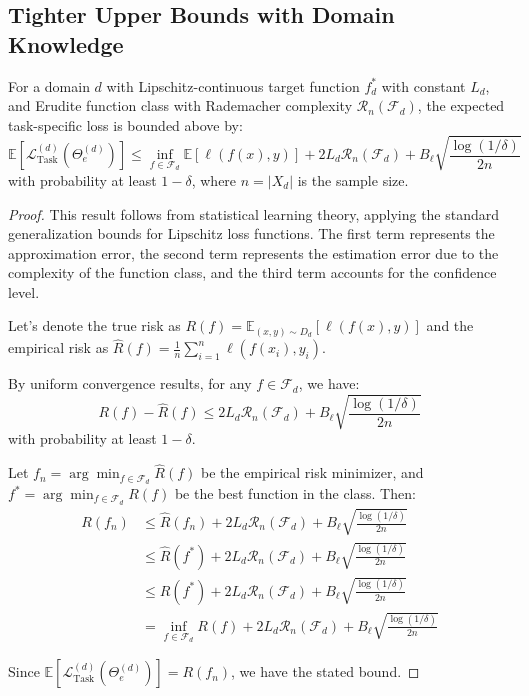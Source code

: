\subsection{Tighter Upper Bounds with Domain Knowledge}

\begin{theorem}
For a domain $d$ with Lipschitz-continuous target function $f^*_d$ with constant $L_d$, and Erudite function class with Rademacher complexity $\mathcal{R}_n(\mathcal{F}_d)$, the expected task-specific loss is bounded above by:
\begin{equation}
\mathbb{E}[\mathcal{L}_{\text{Task}}^{(d)}(\Theta_e^{(d)})] \leq \inf_{f \in \mathcal{F}_d} \mathbb{E}[\ell(f(x), y)] + 2L_d\mathcal{R}_n(\mathcal{F}_d) + B_{\ell}\sqrt{\frac{\log(1/\delta)}{2n}}
\end{equation}
with probability at least $1-\delta$, where $n = |X_d|$ is the sample size.
\end{theorem}

\begin{proof}
This result follows from statistical learning theory, applying the standard generalization bounds for Lipschitz loss functions. The first term represents the approximation error, the second term represents the estimation error due to the complexity of the function class, and the third term accounts for the confidence level.

Let's denote the true risk as $R(f) = \mathbb{E}_{(x,y) \sim D_d}[\ell(f(x), y)]$ and the empirical risk as $\hat{R}(f) = \frac{1}{n}\sum_{i=1}^{n} \ell(f(x_i), y_i)$.

By uniform convergence results, for any $f \in \mathcal{F}_d$, we have:
\begin{equation}
R(f) - \hat{R}(f) \leq 2L_d\mathcal{R}_n(\mathcal{F}_d) + B_{\ell}\sqrt{\frac{\log(1/\delta)}{2n}}
\end{equation}
with probability at least $1-\delta$.

Let $f_n = \arg\min_{f \in \mathcal{F}_d} \hat{R}(f)$ be the empirical risk minimizer, and $f^* = \arg\min_{f \in \mathcal{F}_d} R(f)$ be the best function in the class. Then:
\begin{align}
R(f_n) &\leq \hat{R}(f_n) + 2L_d\mathcal{R}_n(\mathcal{F}_d) + B_{\ell}\sqrt{\frac{\log(1/\delta)}{2n}} \\
&\leq \hat{R}(f^*) + 2L_d\mathcal{R}_n(\mathcal{F}_d) + B_{\ell}\sqrt{\frac{\log(1/\delta)}{2n}} \\
&\leq R(f^*) + 2L_d\mathcal{R}_n(\mathcal{F}_d) + B_{\ell}\sqrt{\frac{\log(1/\delta)}{2n}} \\
&= \inf_{f \in \mathcal{F}_d} R(f) + 2L_d\mathcal{R}_n(\mathcal{F}_d) + B_{\ell}\sqrt{\frac{\log(1/\delta)}{2n}}
\end{align}

Since $\mathbb{E}[\mathcal{L}_{\text{Task}}^{(d)}(\Theta_e^{(d)})] = R(f_n)$, we have the stated bound.
\end{proof}

